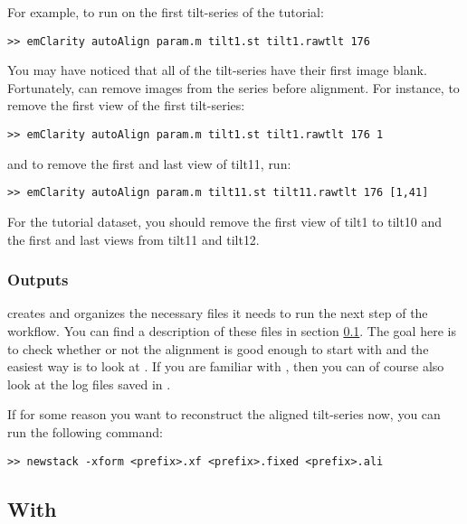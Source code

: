 For example, to run  on the first tilt-series of the tutorial:
\begin{lstlisting}
>> emClarity autoAlign param.m tilt1.st tilt1.rawtlt 176
\end{lstlisting}


You may have noticed that all of the tilt-series have their first image blank. Fortunately,  can remove images from the series before alignment. For instance, to remove the first view of the first tilt-series:
\begin{lstlisting}
>> emClarity autoAlign param.m tilt1.st tilt1.rawtlt 176 1
\end{lstlisting}
and to remove the first and last view of tilt11, run:
\begin{lstlisting}
>> emClarity autoAlign param.m tilt11.st tilt11.rawtlt 176 [1,41]
\end{lstlisting}
\begin{note}For the tutorial dataset, you should remove the first view of tilt1 to tilt10 and the first and last views from tilt11 and tilt12.
\end{note}


\subsubsection{Outputs}

{\emClarity} creates and organizes the necessary files it needs to run the next step of the workflow. You can find a description of these files in section \ref{sec:tilt_series_alignment:ETomo}. The goal here is to check whether or not the alignment is good enough to start with and the easiest way is to look at .
If you are familiar with {\ETomo}, then you can of course also look at the log files saved in .

If for some reason you want to reconstruct the aligned tilt-series now, you can run the following command:
\begin{lstlisting}
>> newstack -xform <prefix>.xf <prefix>.fixed <prefix>.ali
\end{lstlisting}


\subsection{With {\ETomo}} \label{sec:tilt_series_alignment:ETomo}


